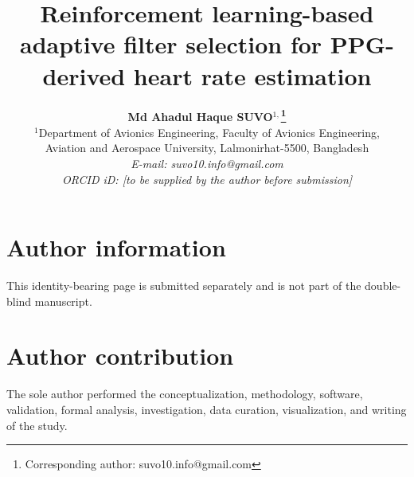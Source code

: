 \documentclass{elektr}
\title{Reinforcement learning-based adaptive filter selection for PPG-derived heart rate estimation}
\author[Md Ahadul Haque SUVO]{
    \textbf{Md Ahadul Haque SUVO$^{1,}$\thanks{Corresponding author: suvo10.info@gmail.com}}\\
    $^{1}$Department of Avionics Engineering, Faculty of Avionics Engineering,\\
    Aviation and Aerospace University, Lalmonirhat-5500, Bangladesh\\
    \textit{E-mail: suvo10.info@gmail.com}\\
    \textit{ORCID iD: [to be supplied by the author before submission]}
}
\begin{document}
\maketitle

\section*{Author information}

This identity-bearing page is submitted separately and is not part of the
double-blind manuscript.

\section*{Author contribution}

The sole author performed the conceptualization, methodology, software,
validation, formal analysis, investigation, data curation, visualization, and
writing of the study.
\end{document}
